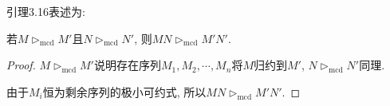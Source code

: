 引理3.16表述为:

若$M\rhd_{\mathrm{mcd}}M'$且$N\rhd_{\mathrm{mcd}}N'$, 则$MN\rhd_{\mathrm{mcd}}M'N'$.
\begin{proof}
    $M\rhd_{\mathrm{mcd}}M'$说明存在序列$M_1,M_2,\cdots,M_n$将$M$归约到$M'$, $N\rhd_{\mathrm{mcd}}N'$同理.
	
	由于$M_i$恒为剩余序列的极小可约式, 所以$MN\rhd_{\mathrm{mcd}}M'N'$.
\end{proof}